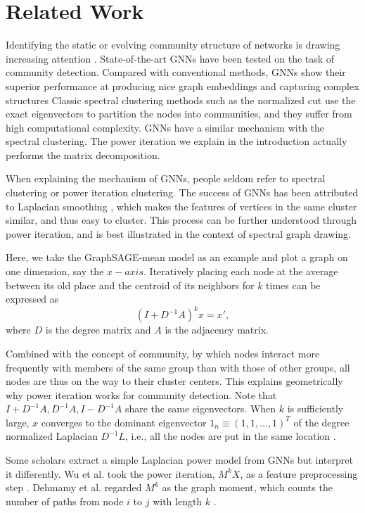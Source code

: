 \documentclass[preprint,11pt]{elsarticle}
\begin{document}
\section{Related Work}
Identifying the static or evolving community structure of networks is drawing increasing attention  \cite{ref3, ref4, ref5}. State-of-the-art GNNs have been tested on the task of community detection. Compared with conventional methods, GNNs show their superior performance at producing nice graph embeddings and capturing complex structures  \cite{ref6} Classic spectral clustering methods such as the normalized cut  \cite{ref7} use the exact eigenvectors to partition the nodes into communities, and they suffer from high computational complexity. GNNs have a similar mechanism with the spectral clustering. The power iteration we explain in the introduction actually performs the matrix decomposition.

When explaining the mechanism of GNNs, people seldom refer to spectral clustering or power iteration clustering. The success of GNNs has been attributed to Laplacian smoothing  \cite{ref8}, which makes the features of vertices in the same cluster similar, and thus easy to cluster. This process can be further understood through power iteration, and is best illustrated in the context of spectral graph drawing.

Here, we take the GraphSAGE-mean model as an example and plot a graph on one dimension, say the $x-axis$. Iteratively placing each node at the average between its old place and the centroid of its neighbors for $k$ times can be expressed as
 \begin{equation}
 (I + D^{-1}A)^{k}x = x',
 \end{equation}
where $D$ is the degree matrix and $A$ is the adjacency matrix.

Combined with the concept of community, by which nodes interact more frequently with members of the same group than with those of other groups, all nodes are thus on the way to their cluster centers. This explains geometrically why power iteration works for community detection. Note that $I+D^{-1}A, D^{-1}A, I - D^{-1}A$ share the same eigenvectors. When $k$ is sufficiently large, $x$ converges to the dominant eigenvector $1_n\equiv (1,1,...,1)^T$ of the degree normalized Laplacian $D^{-1}L$, i.e., all the nodes are put in the same location  \cite{ref9}. 

Some scholars extract a simple Laplacian power model from GNNs but interpret it differently. Wu et al. took the power iteration, $M^kX$, as a feature preprocessing step  \cite{ref10}. Dehmamy et al. regarded $M^k$ as the graph moment, which counts the number of paths from node $i$ to $j$ with length $k$ \cite{ref11}. 
\end{document}
